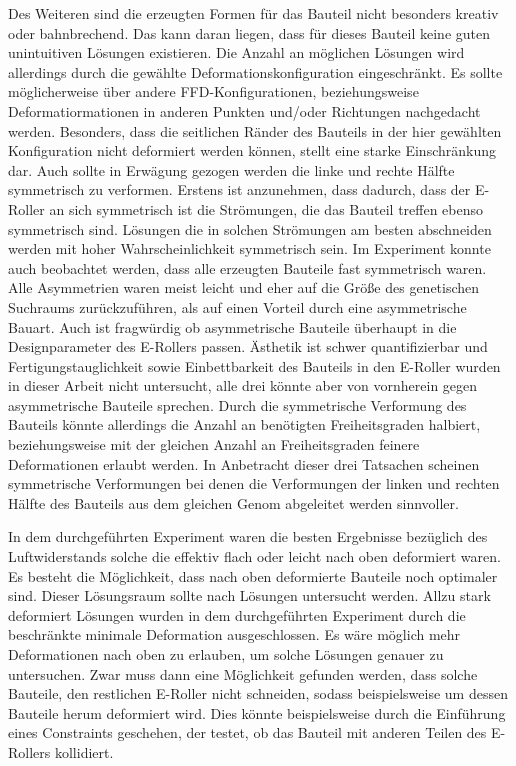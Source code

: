 Des Weiteren sind die erzeugten Formen für das Bauteil nicht besonders kreativ oder bahnbrechend.
Das kann daran liegen, dass für dieses Bauteil keine guten unintuitiven Lösungen existieren.
Die Anzahl an möglichen Lösungen wird allerdings durch die gewählte Deformationskonfiguration eingeschränkt.
Es sollte möglicherweise über andere FFD-Konfigurationen, beziehungsweise Deformatiormationen in anderen Punkten und/oder Richtungen nachgedacht werden.
Besonders, dass die seitlichen Ränder des Bauteils in der hier gewählten Konfiguration nicht deformiert werden können, stellt eine starke Einschränkung dar.
Auch sollte in Erwägung gezogen werden die linke und rechte Hälfte symmetrisch zu verformen.
Erstens ist anzunehmen, dass dadurch, dass der E-Roller an sich symmetrisch ist die Strömungen, die das Bauteil treffen ebenso symmetrisch sind.
Lösungen die in solchen Strömungen am besten abschneiden werden mit hoher Wahrscheinlichkeit symmetrisch sein.
Im Experiment konnte auch beobachtet werden, dass alle erzeugten Bauteile fast symmetrisch waren.
Alle Asymmetrien waren meist leicht und eher auf die Größe des genetischen Suchraums zurückzuführen, als auf einen Vorteil durch eine asymmetrische Bauart.
Auch ist fragwürdig ob  asymmetrische Bauteile überhaupt in die Designparameter des E-Rollers passen.
Ästhetik ist schwer quantifizierbar und Fertigungstauglichkeit sowie Einbettbarkeit des Bauteils in den E-Roller wurden in dieser Arbeit nicht untersucht, alle drei könnte aber von vornherein gegen asymmetrische Bauteile sprechen.
Durch die symmetrische Verformung des Bauteils könnte allerdings die Anzahl an benötigten Freiheitsgraden halbiert, beziehungsweise mit der gleichen Anzahl an Freiheitsgraden feinere Deformationen erlaubt werden.
In Anbetracht dieser drei Tatsachen scheinen symmetrische Verformungen bei denen die Verformungen der linken und rechten Hälfte des Bauteils aus dem gleichen Genom abgeleitet werden sinnvoller.

In dem durchgeführten Experiment waren die besten Ergebnisse bezüglich des Luftwiderstands solche die effektiv flach oder leicht nach oben deformiert waren.
Es besteht die Möglichkeit, dass nach oben deformierte Bauteile noch optimaler sind.
Dieser Lösungsraum sollte nach Lösungen untersucht werden.
Allzu stark deformiert Lösungen wurden in  dem durchgeführten Experiment durch die beschränkte minimale Deformation ausgeschlossen.
Es wäre möglich mehr Deformationen nach oben zu erlauben, um solche Lösungen genauer zu untersuchen.
Zwar muss dann eine Möglichkeit gefunden werden, dass solche Bauteile, den restlichen E-Roller nicht schneiden, sodass beispielsweise um dessen Bauteile herum deformiert wird.
Dies könnte beispielsweise durch die Einführung eines Constraints geschehen, der testet, ob das Bauteil mit anderen Teilen des E-Rollers kollidiert.

